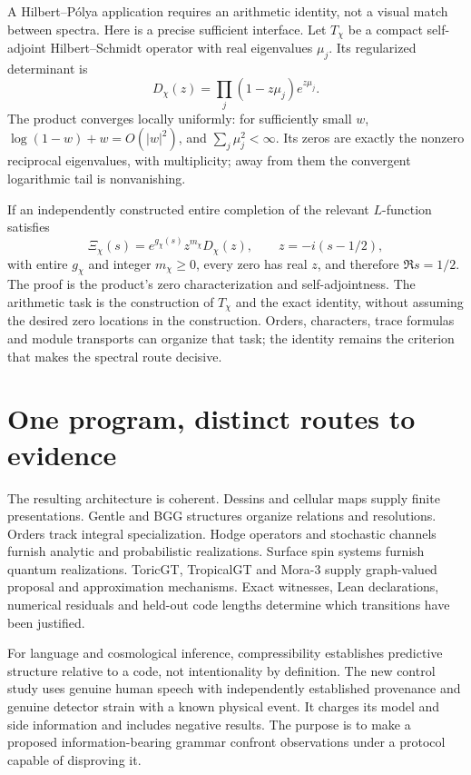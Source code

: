 A Hilbert--P\'olya application requires an arithmetic identity, not a visual match between spectra. Here is a precise sufficient interface. Let $T_\chi$ be a compact self-adjoint Hilbert--Schmidt operator with real eigenvalues $\mu_j$. Its regularized determinant is
\[
 D_\chi(z)=\prod_j(1-z\mu_j)e^{z\mu_j}.
\]
The product converges locally uniformly: for sufficiently small $w$, $\log(1-w)+w=O(|w|^2)$, and $\sum_j\mu_j^2<\infty$. Its zeros are exactly the nonzero reciprocal eigenvalues, with multiplicity; away from them the convergent logarithmic tail is nonvanishing.

If an independently constructed entire completion of the relevant $L$-function satisfies
\[
 \Xi_\chi(s)=e^{g_\chi(s)}z^{m_\chi}D_\chi(z),
 \qquad z=-i(s-1/2),
\]
with entire $g_\chi$ and integer $m_\chi\ge0$, every zero has real $z$, and therefore $\Re s=1/2$. The proof is the product's zero characterization and self-adjointness. The arithmetic task is the construction of $T_\chi$ and the exact identity, without assuming the desired zero locations in the construction. Orders, characters, trace formulas and module transports can organize that task; the identity remains the criterion that makes the spectral route decisive.

\section{One program, distinct routes to evidence}

The resulting architecture is coherent. Dessins and cellular maps supply finite presentations. Gentle and BGG structures organize relations and resolutions. Orders track integral specialization. Hodge operators and stochastic channels furnish analytic and probabilistic realizations. Surface spin systems furnish quantum realizations. ToricGT, TropicalGT and Mora-3 supply graph-valued proposal and approximation mechanisms. Exact witnesses, Lean declarations, numerical residuals and held-out code lengths determine which transitions have been justified.

For language and cosmological inference, compressibility establishes predictive structure relative to a code, not intentionality by definition. The new control study uses genuine human speech with independently established provenance and genuine detector strain with a known physical event. It charges its model and side information and includes negative results. The purpose is to make a proposed information-bearing grammar confront observations under a protocol capable of disproving it.

